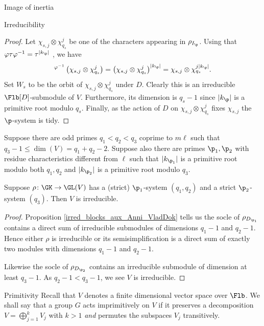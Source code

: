\documentclass[11pt,a4paper]{article}
\begin{document}
\begin{section}{Image of inertia}
\begin{subsection}{Irreducibility}
\begin{proof}
Let $\chi_{s,j} \otimes \chi_{q_s}^j$ be one of the characters appearing in $\rho_{I_\p}$.
Using that $\varphi \tau \varphi^{-1} = \tau ^{|k_\p|}$ \cite[7.5.3]{Neukirch_cohom_of_number_fields}, we have
$$^{\varphi^{-1} }\left(\chi_{s,j} \otimes \chi_{q_s}^j\right) = \left(\chi_{s,j} \otimes \chi_{q_s}^j\right)^{|k_\p|} = \chi_{s,j} \otimes \chi_{q_s}^{j|k_\p|} .$$
Set $W_s$ to be the orbit of $\chi_{s,j} \otimes \chi_{q_s}^j$ under $D$. Clearly this is an irreducible $\Flb[D]$-submodule of $V$. Furthermore, its dimension is $q_s-1$ since $|k_\p|$ is a primitive root modulo $q_s$. 
Finally, as the action of $D$ on $\chi_{s,j} \otimes \chi_{q_s}^j$ fixes $\chi_{s,j}$ the $\p$-system is tidy.
\end{proof}

\begin{proposition}
\label{prop_irreducibility}
Suppose there are odd primes $q_1<q_2<q_3$ coprime to $m\ell$ such that $q_3-1 \leq \dim(V) = q_1+q_2 - 2$.
Suppose also there are primes $\p_1,\p_2$ with residue characteristics different from $\ell$ such that $|k_{\p_1}|$ is a primitive root modulo both $q_1,q_2$ and $|k_{\p_2}|$ is a primitive root modulo $q_3$.

Suppose $\rho\colon \GK \rightarrow \GL(V)$ has a (strict) $\p_1$-system $(q_1,q_2)$ and a strict $\p_2$-system $(q_3)$.
Then $V$ is irreducible.
\end{proposition}

\begin{proof}
Proposition \ref{irred_blocks_aux_Anni_VladDok} tells us the socle of $\rho_{D_{\p_1}}$ contains a direct sum of irreducible submodules of dimensions $q_1-1$ and $q_2-1$. Hence either $\rho$ is irreducible or its semisimplification is a direct sum of exactly two modules with dimensions $q_1-1$ and $q_2-1$.

Likewise the socle of $\rho_{D_{\p_2}}$ contains an irreducible submodule of dimension at least $q_3-1$. As $q_2-1 < q_3-1$,  we see $V$ is irreducible.
\end{proof}

\end{subsection}

\begin{subsection}{Primitivity}
\label{subsection_primitivity}
Recall that $V$ denotes a finite dimensional vector space over $\Flb$. 
We shall say that a group $G$ acts imprimitively on $V$ if it preserves a decomposition $V= \bigoplus^k_{j=1} V_j$ with $k>1$ \emph{and} permutes the subspaces $V_j$ transitively.


\end{subsection}
\end{section}
\end{document}
